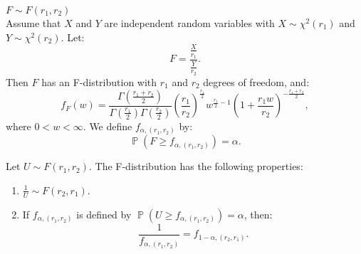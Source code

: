 \documentclass{huhtakm-template-book-v2}
\DeclareMathOperator{\prob}{\mathbb{P}}
\begin{document}
    \begin{eg} $F \sim F(r_{1}, r_{2})$\\
        Assume that $X$ and $Y$ are independent random variables with $X \sim \chi^{2}(r_{1})$ and $Y \sim \chi^{2}(r_{2})$. Let:
        \begin{equation*}
            F = \frac{\frac{X}{r_{1}}}{\frac{Y}{r_{2}}}.
        \end{equation*}
        Then $F$ has an F-distribution with $r_{1}$ and $r_{2}$ degrees of freedom, and:
        \begin{equation*}
            f_{F}(w) = \frac{\Gamma\left(\frac{r_{1} + r_{2}}{2}\right)}{\Gamma\left(\frac{r_{1}}{2}\right) \Gamma\left(\frac{r_{2}}{2}\right)} \left(\frac{r_{1}}{r_{2}}\right)^{\frac{r_{1}}{2}} w^{\frac{r_{1}}{2} - 1} \left(1 + \frac{r_{1}w}{r_{2}}\right)^{-\frac{r_{1} + r_{2}}{2}},
        \end{equation*}
        where $0 < w < \infty$. We define $f_{\alpha, (r_{1}, r_{2})}$ by:
        \begin{equation*}
            \prob(F \geq f_{\alpha, (r_{1}, r_{2})}) = \alpha.
        \end{equation*}
    \end{eg}
    \begin{lem}
        Let $U \sim F(r_{1}, r_{2})$. The F-distribution has the following properties:
        \begin{enumerate}
            \item $\frac{1}{U} \sim F(r_{2}, r_{1})$.
            \item If $f_{\alpha, (r_{1}, r_{2})}$ is defined by $\prob(U \geq f_{\alpha, (r_{1}, r_{2})}) = \alpha$, then:
            \begin{equation*}
                \frac{1}{f_{\alpha, (r_{1}, r_{2})}} = f_{1 - \alpha, (r_{2}, r_{1})}.
            \end{equation*}
        \end{enumerate}
    \end{lem}
\end{document}
